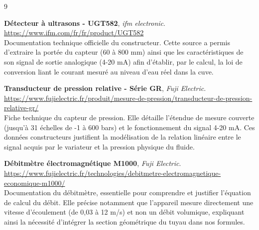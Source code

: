 \documentclass[12pt,a4paper]{article}
\begin{document}
\clearpage
\begin{thebibliography}{9}

\textbf{Détecteur à ultrasons - UGT582}, \textit{ifm electronic}.\\
\url{https://www.ifm.com/fr/fr/product/UGT582}\\
\small{Documentation technique officielle du constructeur. Cette source a permis d'extraire la portée du capteur (60 à 800 mm) ainsi que les caractéristiques de son signal de sortie analogique (4-20 mA) afin d'établir, par le calcul, la loi de conversion liant le courant mesuré au niveau d'eau réel dans la cuve.}

\vspace{0.5cm}

\textbf{Transducteur de pression relative - Série GR}, \textit{Fuji Electric}.\\
\url{https://www.fujielectric.fr/produit/mesure-de-pression/transducteur-de-pression-relative-gr/}\\
\small{Fiche technique du capteur de pression. Elle détaille l'étendue de mesure couverte (jusqu'à 31 échelles de -1 à 600 bars) et le fonctionnement du signal 4-20 mA. Ces données constructeurs justifient la modélisation de la relation linéaire entre le signal acquis par le variateur et la pression physique du fluide.}

\vspace{0.5cm}

\textbf{Débitmètre électromagnétique M1000}, \textit{Fuji Electric}.\\
\url{https://www.fujielectric.fr/technologies/debitmetre-electromagnetique-economique-m1000/}\\
\small{Documentation du débitmètre, essentielle pour comprendre et justifier l'équation de calcul du débit. Elle précise notamment que l'appareil mesure directement une vitesse d'écoulement (de 0,03 à 12 m/s) et non un débit volumique, expliquant ainsi la nécessité d'intégrer la section géométrique du tuyau dans nos formules.}

\end{thebibliography}


\listoffigures
\cleardoublepage
\end{document}
